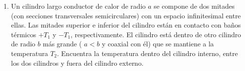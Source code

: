 \begin{enumerate}
\item Un cilindro largo conductor de calor de radio $a$ se compone de dos mitades (con secciones transversales semicirculares) con un espacio infinitesimal entre ellas. Las mitades superior e inferior del cilindro están en contacto con baños térmicos $+T_{1}$ y $-T_{1}$, respectivamente. El cilindro está dentro de otro cilindro de radio $b$ más grande ( $a < b$ y coaxial con él) que se mantiene a la temperatura $T_{2}$. Encuentra la temperatura dentro del cilindro interno, entre los dos cilindros y fuera del cilindro externo.
% 

\end{enumerate}
